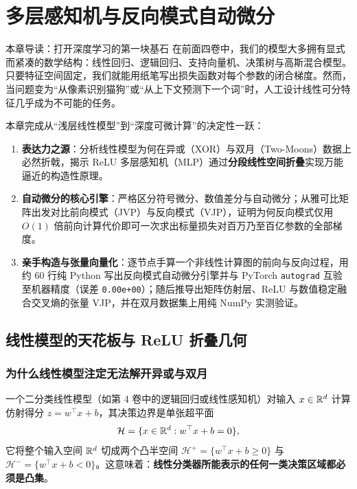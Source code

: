 \chapter[多层感知机与反向模式自动微分]{多层感知机与反向模式自动微分}
\label{ch:mlp-autodiff}


\begin{chapIntro}{本章导读：打开深度学习的第一块基石}
在前面四卷中，我们的模型大多拥有显式而紧凑的数学结构：线性回归、逻辑回归、支持向量机、决策树与高斯混合模型。只要特征空间固定，我们就能用纸笔写出损失函数对每个参数的闭合梯度。然而，当问题变为“从像素识别猫狗”或“从上下文预测下一个词”时，人工设计线性可分特征几乎成为不可能的任务。

本章完成从“浅层线性模型”到“深度可微计算”的决定性一跃：
\begin{enumerate}
  \item \textbf{表达力之源}：分析线性模型为何在异或（XOR）与双月（Two-Moons）数据上必然折戟，揭示 ReLU 多层感知机（MLP）通过\textbf{分段线性空间折叠}实现万能逼近的构造性原理。
  \item \textbf{自动微分的核心引擎}：严格区分符号微分、数值差分与自动微分；从雅可比矩阵出发对比前向模式（JVP）与反向模式（VJP），证明为何反向模式仅用 $O(1)$ 倍前向计算代价即可一次求出标量损失对百万乃至百亿参数的全部梯度。
  \item \textbf{亲手构造与张量向量化}：逐节点手算一个非线性计算图的前向与反向过程，用约 60 行纯 Python 写出反向模式自动微分引擎并与 PyTorch \texttt{autograd} 互验至机器精度（误差 \texttt{0.00e+00}）；随后推导出矩阵仿射层、ReLU 与数值稳定融合交叉熵的张量 VJP，并在双月数据集上用纯 NumPy 实测验证。
\end{enumerate}
\end{chapIntro}

\section{线性模型的天花板与 ReLU 折叠几何}
\label{sec:mlp-geometry}

\subsection{为什么线性模型注定无法解开异或与双月}

一个二分类线性模型（如第 4 卷中的逻辑回归或线性感知机）对输入 $x \in \mathbb{R}^d$ 计算仿射得分 $z = w^\top x + b$，其决策边界是单张超平面
\[
  \mathcal{H} = \{x \in \mathbb{R}^d : w^\top x + b = 0\},
\]
它将整个输入空间 $\mathbb{R}^d$ 切成两个凸半空间 $\mathcal{H}^+ = \{w^\top x + b \ge 0\}$ 与 $\mathcal{H}^- = \{w^\top x + b < 0\}$。这意味着：\textbf{线性分类器所能表示的任何一类决策区域都必须是凸集}。

